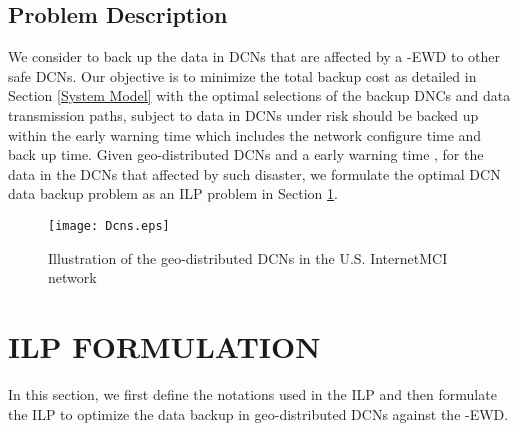 \documentclass[conference]{IEEEtran}\IEEEoverridecommandlockouts
\begin{document}
\subsection{Problem Description}
We consider to back up the data in DCNs that are affected by a   -EWD to other safe DCNs.  Our objective is to minimize the total backup cost as detailed in Section \ref{System Model} with the optimal selections of the backup DNCs and data transmission paths, subject to data in DCNs under risk should be backed up within the  early warning time which includes the network configure time and back up time.  Given geo-distributed DCNs and a  early warning time , for the data in the DCNs that affected by such disaster,  we formulate the optimal DCN data backup problem as an ILP problem in Section \ref{ILP FORMULATION}.
\begin{figure}[t]
      \centering
      \texttt{[image: Dcns.eps]}
   \caption{Illustration of the geo-distributed DCNs in the  U.S. InternetMCI network}
   \label{fig:Illustration of geo-distributed DCNs in U.S. InternetMCI network}
  \end{figure}
 \section{ILP FORMULATION}\label{ILP FORMULATION}
In this section, we first define the notations used in the ILP and then formulate the ILP to optimize the data backup in geo-distributed DCNs against the -EWD.
\end{document}
